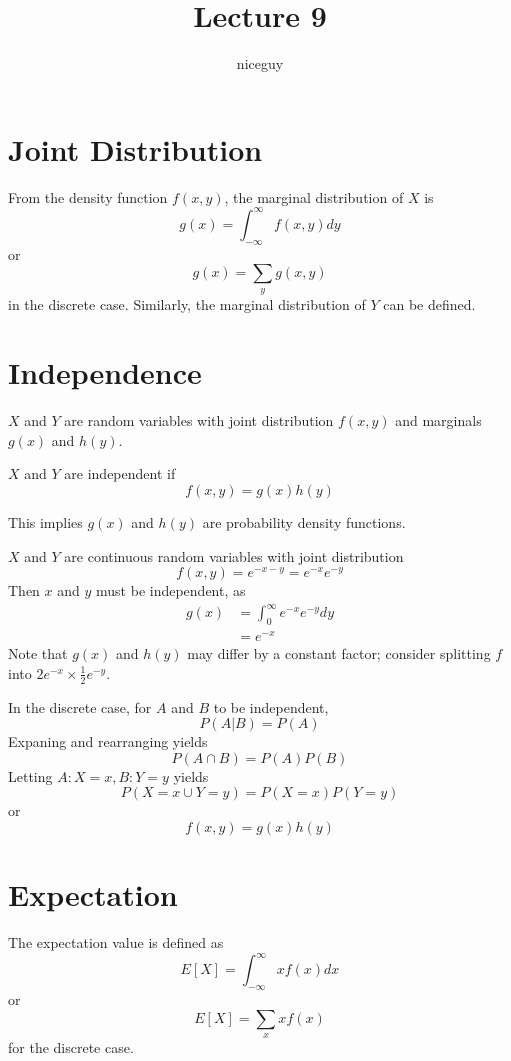 \documentclass[12pt]{article}
\author{niceguy}
\title{Lecture 9}
\begin{document}
\maketitle

\section{Joint Distribution}

From the density function $f(x,y)$, the marginal distribution of $X$ is
$$g(x) = \int_{-\infty}^\infty f(x,y)dy$$
or
$$g(x) = \sum_yg(x,y)$$
in the discrete case. Similarly, the marginal distribution of $Y$ can be defined.

\section{Independence}

$X$ and $Y$ are random variables with joint distribution $f(x,y)$ and marginals $g(x)$ and $h(y)$.

\begin{defn}
	$X$ and $Y$ are independent if
	$$f(x,y) = g(x)h(y)$$
\end{defn}

This implies $g(x)$ and $h(y)$ are probability density functions.

\begin{ex}
	$X$ and $Y$ are continuous random variables with joint distribution
	$$f(x,y) = e^{-x-y} = e^{-x}e^{-y}$$
	Then $x$ and $y$ must be independent, as
	\begin{align*}
		g(x) &= \int_0^\infty e^{-x}e^{-y}dy \\
		     &= e^{-x}
	\end{align*}
	Note that $g(x)$ and $h(y)$ may differ by a constant factor; consider splitting $f$ into $2e^{-x}\times\frac{1}{2}e^{-y}$.
\end{ex}

In the discrete case, for $A$ and $B$ to be independent,
$$P(A|B) = P(A)$$
Expaning and rearranging yields
$$P(A\cap B) = P(A)P(B)$$
Letting $A:X=x, B:Y=y$ yields
$$P(X=x\cup Y=y) = P(X=x)P(Y=y)$$
or
$$f(x,y) = g(x)h(y)$$

\section{Expectation}

\begin{defn}
	The expectation value is defined as
	$$E[X] = \int_{-\infty}^\infty xf(x)dx$$
	or
	$$E[X] = \sum_x xf(x)$$
	for the discrete case.
\end{defn}
\end{document}
